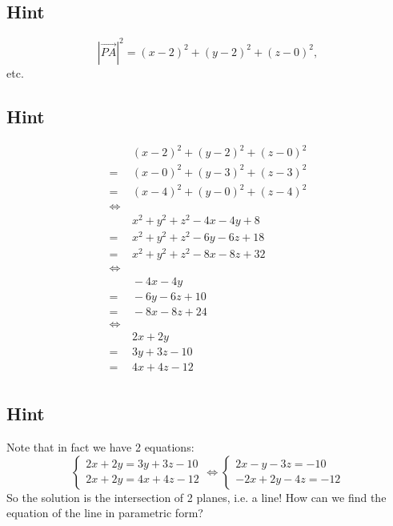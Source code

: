 \documentclass[a4paper,10pt]{article}
\begin{document}
\subsection{Hint}
\[
    \left|\overrightarrow{PA}\right|^2 = (x-2)^2 + (y-2)^2 +(z-0)^2,
\]
etc.

\subsection{Hint}
\begin{align*}
         & \ (x-2)^2 + (y-2)^2 + (z-0)^2    \\
    =    & \ (x-0)^2 + (y-3)^2 + (z-3)^2    \\
    =    & \ (x-4)^2 + (y-0)^2 + (z-4)^2    \\
    \iff &                                  \\
         & \ x^2 + y^2 + z^2 - 4x - 4y + 8  \\
    =    & \ x^2 + y^2 + z^2 - 6y - 6z + 18 \\
    =    & \ x^2 + y^2 + z^2 - 8x - 8z + 32 \\
    \iff &                                  \\
         & \ - 4x - 4y                      \\
    =    & \ - 6y - 6z + 10                 \\
    =    & \ - 8x - 8z + 24                 \\
    \iff &                                  \\
         & \ 2x + 2y                        \\
    =    & \ 3y + 3z - 10                   \\
    =    & \ 4x + 4z - 12                   \\
\end{align*}

\subsection{Hint}
Note that in fact we have 2 equations:
\[
    \begin{cases}
        2x + 2y = 3y + 3z - 10 \\
        2x + 2y = 4x + 4z - 12
    \end{cases} \iff \begin{cases}
        2x - y - 3z = -10 \\
        -2x + 2y - 4z = -12
    \end{cases}
\]
So the solution is the intersection of 2 planes, i.e. a line! How can we find the equation of the line in parametric form?
\end{document}
